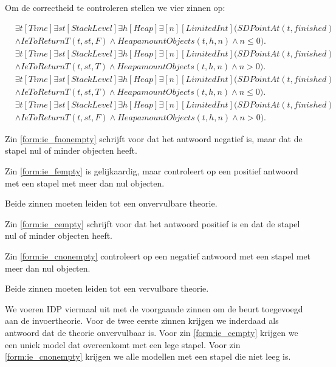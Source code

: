 Om de correctheid te controleren stellen we vier zinnen op:

\begin{align}
	\nonumber&\exists{t}[Time]\exists{st}[StackLevel]\exists{h}[Heap]\exists[n][LimitedInt](SDPointAt(t, finished) \\ &\land IeToReturnT(t, st, F) \land HeapamountObjects(t, h, n) \land n \leq 0).\label{form:ie_fnonempty} \\
	\nonumber&\exists{t}[Time]\exists{st}[StackLevel]\exists{h}[Heap]\exists[n][LimitedInt](SDPointAt(t, finished) \\ &\land IeToReturnT(t, st, T) \land HeapamountObjects(t, h, n) \land n > 0).\label{form:ie_fempty} \\
	\nonumber&\exists{t}[Time]\exists{st}[StackLevel]\exists{h}[Heap]\exists[n][LimitedInt](SDPointAt(t, finished) \\ &\land IeToReturnT(t, st, T) \land HeapamountObjects(t, h, n) \land n \leq 0).\label{form:ie_cempty} \\
	\nonumber&\exists{t}[Time]\exists{st}[StackLevel]\exists{h}[Heap]\exists[n][LimitedInt](SDPointAt(t, finished) \\ &\land IeToReturnT(t, st, F) \land HeapamountObjects(t, h, n) \land n > 0).\label{form:ie_cnonempty}
\end{align}

Zin \ref{form:ie_fnonempty} schrijft voor dat het antwoord negatief is, maar dat de stapel nul of minder objecten heeft.

Zin \ref{form:ie_fempty} is gelijkaardig, maar controleert op een positief antwoord met een stapel met meer dan nul objecten.

Beide zinnen moeten leiden tot een onvervulbare theorie.

Zin \ref{form:ie_cempty} schrijft voor dat het antwoord positief is en dat de stapel nul of minder objecten heeft.

Zin \ref{form:ie_cnonempty} controleert op een negatief antwoord met een stapel met meer dan nul objecten.

Beide zinnen moeten leiden tot een vervulbare theorie.

We voeren IDP viermaal uit met de voorgaande zinnen om de beurt toegevoegd aan de invoertheorie. Voor de twee eerste zinnen krijgen we inderdaad als antwoord dat de theorie onvervulbaar is. Voor zin \ref{form:ie_cempty} krijgen we een uniek model dat overeenkomt met een lege stapel. Voor zin \ref{form:ie_cnonempty} krijgen we alle modellen met een stapel die niet leeg is.

